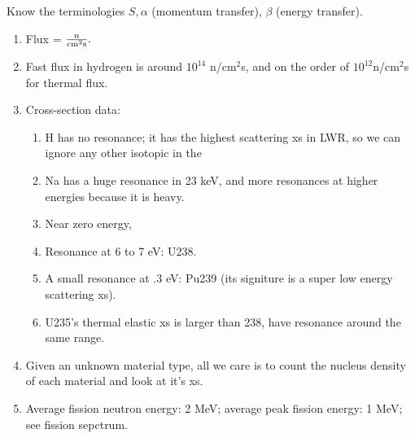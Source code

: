 \documentclass{school-22.211-notes}
\begin{document}
Know the terminologies $S, \alpha$ (momentum transfer), $\beta$ (energy transfer). 




\begin{enumerate}
\item Flux = $\frac{n}{\mathrm{cm}^2 \mathrm{s}}.$

\item Fast flux in hydrogen is around $10^{14}$ n/cm$^2$s, and on the order of $10^{12}$n/cm$^2$s for thermal flux. 

\item Cross-section data: 
\begin{enumerate}
\item H has no resonance; it has the highest scattering xs in LWR, so we can ignore any other isotopic in the  
\item Na has a huge resonance in 23 keV, and more resonances at higher energies because it is heavy. 
\item Near zero energy,
\item Resonance at 6 to 7 eV: U238. 
\item A small resonance at .3 eV: Pu239 (its signiture is a super low energy scattering xs). 
\item U235's thermal elastic xs is larger than 238, have resonance around the same range. 
  
\end{enumerate}

\item Given an unknown material type, all we care is to count the nucleus density of each material and look at it's xs. 

\item Average fission neutron energy: 2 MeV; average peak fission energy: 1 MeV; see fission sepctrum. 

\end{enumerate}
\end{document}
